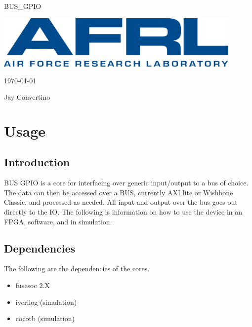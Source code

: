 \begin{titlepage}
  \begin{center}

  {\Huge BUS\_GPIO}

  \vspace{25mm}

  \includegraphics[width=0.90\textwidth,height=\textheight,keepaspectratio]{img/AFRL.png}

  \vspace{25mm}

  \today

  \vspace{15mm}

  {\Large Jay Convertino}

  \end{center}
\end{titlepage}

\tableofcontents

\newpage

\section{Usage}

\subsection{Introduction}

\par
BUS GPIO is a core for interfacing over generic input/output to a bus of choice. The data can then be accessed over a BUS,
currently AXI lite or Wishbone Classic, and processed as needed. All input and output over the bus goes out directly to the IO.
The following is information on how to use the device in an FPGA, software, and in simulation.

\subsection{Dependencies}

\par
The following are the dependencies of the cores.

\begin{itemize}
  \item fusesoc 2.X
  \item iverilog (simulation)
  \item cocotb (simulation)
\end{itemize}

